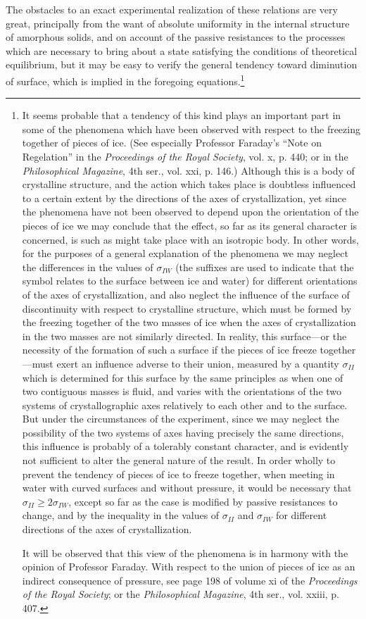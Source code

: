 \documentclass[12pt]{article}
\begin{document}
The obstacles to an exact experimental realization of these relations are very great, principally from the want of absolute uniformity in the internal structure of amorphous solids, and on account of the passive resistances to the processes which are necessary to bring about a state satisfying the conditions of theoretical equilibrium, but it may be easy to verify the general tendency toward diminution of surface, which is implied in the foregoing equations.\footnote{It seems probable that a tendency of this kind plays an important part in some of the phenomena which have been observed with respect to the freezing together of pieces of ice. (See especially Professor Faraday's ``Note on Regelation'' in the \textit{Proceedings of the Royal Society}, vol. x, p. 440; or in the \textit{Philosophical Magazine}, 4th ser., vol. xxi, p. 146.) Although this is a body of crystalline structure, and the action which takes place is doubtless influenced to a certain extent by the directions of the axes of crystallization, yet since the phenomena have not been observed to depend upon the orientation of the pieces of ice we may conclude that the effect, so far as its general character is concerned, is such as might take place with an isotropic body. In other words, for the purposes of a general explanation of the phenomena we may neglect the differences in the values of $\sigma_{IW}$ (the suffixes are used to indicate that the symbol relates to the surface between ice and water) for different orientations of the axes of crystallization, and also neglect the influence of the surface of discontinuity with respect to crystalline structure, which must be formed by the freezing together of the two masses of ice when the axes of crystallization in the two masses are not similarly directed. In reality, this surface---or the necessity of the formation of such a surface if the pieces of ice freeze together---must exert an influence adverse to their union, measured by a quantity $\sigma_{II}$ which is determined for this surface by the same principles as when one of two contiguous masses is fluid, and varies with the orientations of the two systems of crystallographic axes relatively to each other and to the surface. But under the circumstances of the experiment, since we may neglect the possibility of the two systems of axes having precisely the same directions, this influence is probably of a tolerably constant character, and is evidently not sufficient to alter the general nature of the result. In order wholly to prevent the tendency of pieces of ice to freeze together, when meeting in water with curved surfaces and without pressure, it would be necessary that $\sigma_{II}\geq 2 \sigma_{IW}$, except so far as the case is modified by passive resistances to change, and by the inequality in the values of $\sigma_{II}$ and $\sigma_{IW}$ for different directions of the axes of crystallization. \par
It will be observed that this view of the phenomena is in harmony with the opinion of Professor Faraday. With respect to the union of pieces of ice as an indirect consequence of pressure, see page 198 of volume xi of the \textit{Proceedings of the Royal Society}; or the \textit{Philosophical Magazine}, 4th ser., vol. xxiii, p. 407.}
\end{document}

